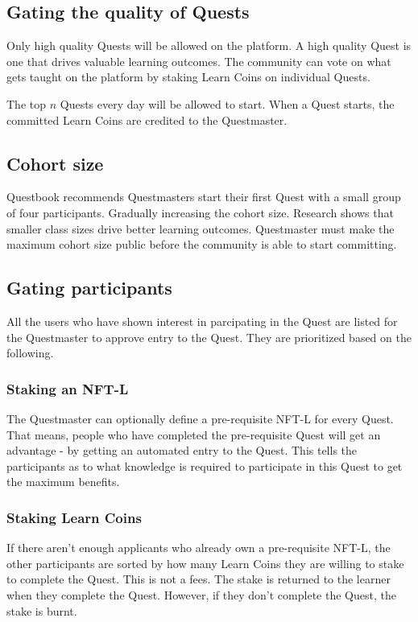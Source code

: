 \documentclass{article}
\begin{document}
    \subsection{Gating the quality of Quests}
        Only high quality Quests will be allowed on the platform.
        A high quality Quest is one that drives valuable learning outcomes. 
        The community can vote on what gets taught on the platform by staking Learn Coins on individual Quests.
        \par
        The top \(n\) Quests every day will be allowed to start. 
        When a Quest starts, the committed Learn Coins are credited to the Questmaster.
    \subsection{Cohort size}
      Questbook recommends Questmasters start their first Quest with a small group of four participants. Gradually increasing the cohort size. 
      Research shows that smaller class sizes drive better learning outcomes. %
      Questmaster must make the maximum cohort size public before the community is able to start committing.
    \subsection{Gating participants}
      All the users who have shown interest in parcipating in the Quest are listed for the Questmaster to approve entry to the Quest. They are prioritized based on the following.
      \subsubsection{Staking an NFT-L}
        The Questmaster can optionally define a pre-requisite NFT-L for every Quest. That means, people who have completed the pre-requisite Quest will get an advantage - by getting an automated entry to the Quest.
        This tells the participants as to what knowledge is required to participate in this Quest to get the maximum benefits. 
      \subsubsection{Staking Learn Coins}
        If there aren't enough applicants who already own a pre-requisite NFT-L, the other participants are sorted by how many Learn Coins they are willing to stake to complete the Quest. This is not a fees. The stake is returned to the learner when they complete the Quest. However, if they don't complete the Quest, the stake is burnt.
\end{document}
